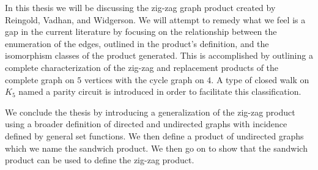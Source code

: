In this thesis we will be discussing the zig-zag graph product created by Reingold, Vadhan, and Widgerson. We will attempt to remedy what we feel is a gap in the current literature by focusing on the relationship between the enumeration of the edges, outlined in the product's definition, and the isomorphism classes of the product generated. This is accomplished by outlining a complete characterization of the zig-zag and replacement products of the complete graph on $5$ vertices with the cycle graph on $4$. A type of closed walk on $K_5$ named a parity circuit is introduced in order to facilitate this classification.

We conclude the thesis by introducing a generalization of the zig-zag product using a broader definition of directed and undirected graphs with incidence defined by general set functions. We then define a product of undirected graphs which we name the sandwich product.  We then go on to show that the sandwich product can be used to define the zig-zag product.


